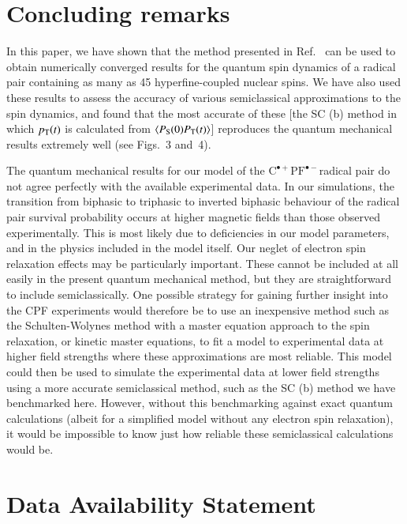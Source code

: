 \documentclass[%
aip,
jcp,%
amsmath,amssymb,
reprint%
]{revtex4-1}
\newcommand{\sing}{\ensuremath{\mathrm{S}}}
\newcommand{\trip}{\ensuremath{\mathrm{T}}}
\newcommand{\CPFrp}{$\text{C}^{\bullet +}\text{PF}^{\bullet-}$}
\begin{document}
\section{Concluding remarks}\label{conc-sec}

In this paper, we have shown that the method presented in Ref.~ can be used to obtain numerically converged results for the quantum spin dynamics of a radical pair containing as many as 45 hyperfine-coupled nuclear spins. We have also used these results to assess the accuracy of various semiclassical approximations to the spin dynamics, and found that the most accurate of these [the SC (b) method in which $p_{\rm T}(t)$ is calculated from $\ev{P_\sing(0)P_\trip(t)}$] reproduces the quantum mechanical results extremely well (see Figs.~3 and~4).

The quantum mechanical results for our model of the \CPFrp radical pair do not agree perfectly with the available experimental data.\cite{Lewis2018} In our simulations, the transition from biphasic to triphasic to inverted biphasic behaviour of the radical pair survival probability occurs at higher magnetic fields than those observed experimentally.\cite{Lewis2018} This is most likely due to deficiencies in our model parameters, and in the physics included in the model itself. Our neglet of electron spin relaxation effects may be particularly important. These cannot be included at all easily in the present quantum mechanical method, but they are straightforward to include semiclassically.\cite{Lewis2014} One possible strategy for gaining further insight into the CPF experiments would therefore be to use an inexpensive method such as the Schulten-Wolynes method with a master equation approach to the spin relaxation,\cite{FayLindoy2019} or kinetic master equations,\cite{Steiner2018,Fay2019,Mims2019} to fit a model to experimental data at higher field strengths where these approximations are most reliable. This model could then be used to simulate the experimental data at lower field strengths using a more accurate semiclassical method, such as the SC (b) method we have benchmarked here. However, without this benchmarking against exact quantum calculations (albeit for a simplified model without any electron spin relaxation), it would be impossible to know just how reliable these semiclassical calculations would be.

\section*{Data Availability Statement}
\end{document}
